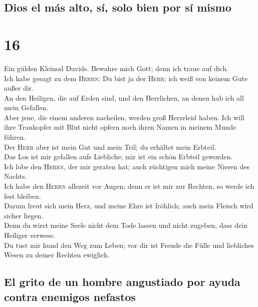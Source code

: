\hypertarget{dios-el-muxe1s-alto-suxed-solo-bien-por-suxed-mismo}{%
\subsection{Dios el más alto, sí, solo bien por sí
mismo}\label{dios-el-muxe1s-alto-suxed-solo-bien-por-suxed-mismo}}

\hypertarget{section-15}{%
\section{16}\label{section-15}}

 Ein gülden Kleinod Davids. Bewahre mich Gott; denn ich
traue auf dich.\\
 Ich habe gesagt zu dem \textsc{Herrn}: Du bist ja der
\textsc{Herr}; ich weiß von keinem Gute außer dir.\\
 An den Heiligen, die auf Erden sind, und den Herrlichen,
an denen hab ich all mein Gefallen.\\
 Aber jene, die einem anderen nacheilen, werden groß
Herzeleid haben. Ich will ihre Trankopfer mit Blut nicht opfern noch
ihren Namen in meinem Munde führen.\\
 Der \textsc{Herr} aber ist mein Gut und mein Teil; du
erhältst mein Erbteil.\\
 Das Los ist mir gefallen aufs Liebliche; mir ist ein
schön Erbteil geworden.\\
 Ich lobe den \textsc{Herrn}, der mir geraten hat; auch
züchtigen mich meine Nieren des Nachts.\\
 Ich habe den \textsc{Herrn} allezeit vor Augen; denn er
ist mir zur Rechten, so werde ich fest bleiben.\\
 Darum freut sich mein Herz, und meine Ehre ist fröhlich;
auch mein Fleisch wird sicher liegen.\\
 Denn du wirst meine Seele nicht dem Tode lassen und
nicht zugeben, dass dein Heiliger verwese.\\
 Du tust mir kund den Weg zum Leben; vor dir ist Freude
die Fülle und liebliches Wesen zu deiner Rechten ewiglich.

\hypertarget{el-grito-de-un-hombre-angustiado-por-ayuda-contra-enemigos-nefastos}{%
\subsection{El grito de un hombre angustiado por ayuda contra enemigos
nefastos}\label{el-grito-de-un-hombre-angustiado-por-ayuda-contra-enemigos-nefastos}}

